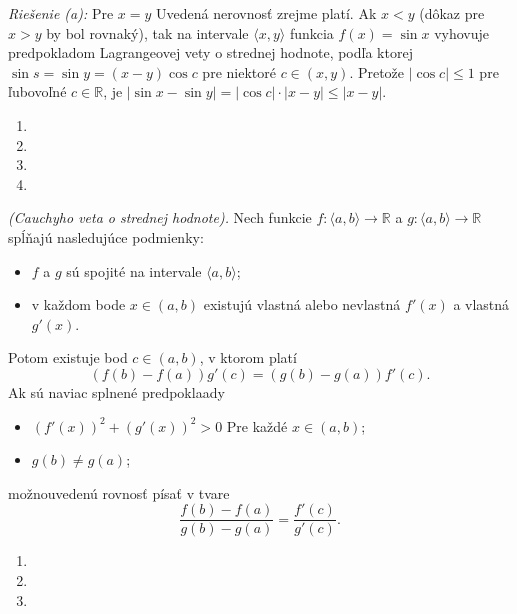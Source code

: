 \textit{Riešenie (a):}
Pre $x=y$ Uvedená nerovnosť zrejme platí. Ak $x<y$ (dôkaz pre $x>y$ by bol rovnaký), tak na intervale $\langle x,y \rangle$ funkcia $f(x)=\sin x$ vyhovuje predpokladom Lagrangeovej vety o strednej hodnote, podľa ktorej $\sin s=\sin y=(x-y)\cos c$ pre niektoré $c\in (x,y)$. Pretože $|\cos c|\leq 1$ pre ľubovoľné $c\in\mathbb{R}$, je $|\sin x-\sin y|=|\cos c|\cdot|x-y|\leq |x-y|$.

\begin{enumerate}[resume]
	\item {}
	\item {}
	\item {}
	\item {}
\end{enumerate}

\begin{veta}
\textit{(Cauchyho veta o strednej hodnote).}
Nech funkcie $f: \langle a,b \rangle \rightarrow \mathbb{R}$ a $g: \langle a,b \rangle \rightarrow \mathbb{R}$ spĺňajú nasledujúce podmienky:
\begin{itemize}
\item $f$ a $g$ sú spojité na intervale $\langle a,b \rangle$;
\item v každom bode $x\in (a,b)$ existujú vlastná alebo nevlastná $f'(x)$ a vlastná $g'(x)$.
\end{itemize}
Potom existuje bod $c\in (a,b)$, v ktorom platí
$$(f(b)-f(a))g'(c)=(g(b)-g(a))f'(c).$$
Ak sú naviac splnené predpoklaady
\begin{itemize}
\item $(f'(x))^2+(g'(x))^2>0$ Pre každé $x\in (a,b)$;
\item $g(b)\neq g(a)$;
\end{itemize}
možnouvedenú rovnosť písať v tvare
$$\frac{f(b)-f(a)}{g(b)-g(a)}=\frac{f'(c)}{g'(c)}.$$
\end{veta}

\begin{enumerate}[resume]
	\item {}
	\item {}
	\item {}
\end{enumerate}

